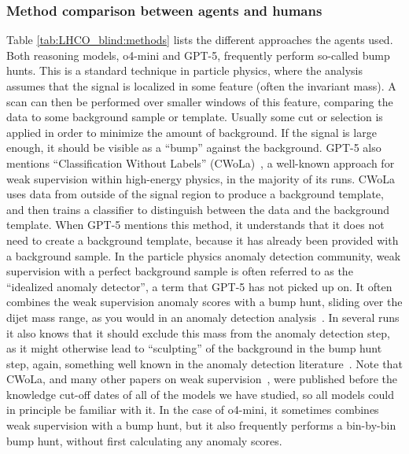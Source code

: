 \documentclass[submission, Phys]{SciPost}
\begin{document}
\subsubsection{Method comparison between agents and humans}
\label{sec:LHCO_blind_methods}
Table \ref{tab:LHCO_blind:methods} lists the different approaches the agents used. Both reasoning models, o4-mini and GPT-5, frequently perform so-called bump hunts. This is a standard technique in particle physics, where the analysis assumes that the signal is localized in some feature (often the invariant mass). A scan can then be performed over smaller windows of this feature, comparing the data to some background sample or template. Usually some cut or selection is applied in order to minimize the amount of background. If the signal is large enough, it should be visible as a ``bump'' against the background. GPT-5 also mentions ``Classification Without Labels'' (CWoLa)~\cite{Metodiev:2017vrx,Collins:2018epr,Collins:2019jip}, a well-known approach for weak supervision within high-energy physics, in the majority of its runs. CWoLa uses data from outside of the signal region to produce a background template, and then trains a classifier to distinguish between the data and the background template. When GPT-5 mentions this method, it understands that it does not need to create a background template, because it has already been provided with a background sample. In the particle physics anomaly detection community, weak supervision with a perfect background sample is often referred to as the ``idealized anomaly detector'', a term that GPT-5 has not picked up on. It often combines the weak supervision anomaly scores with a bump hunt, sliding over the dijet mass range, as you would in an anomaly detection analysis~\cite{CMS:2024nsz,ATLAS:2021weak}. In several runs it also knows that it should exclude this mass from the anomaly detection step, as it might otherwise lead to ``sculpting'' of the background in the bump hunt step, again, something well known in the anomaly detection literature~\cite{Benkendorfer:2020gek, Hallin:2022eoq}. Note that CWoLa, and many other papers on weak supervision~\cite{Nachman:2020lpy, Hallin:2021wme, Raine:2022hht, Golling:2022nkl}, were published before the knowledge cut-off dates of all of the models we have studied, so all models could in principle be familiar with it. In the case of o4-mini, it sometimes combines weak supervision with a bump hunt, but it also frequently performs a bin-by-bin bump hunt, without first calculating any anomaly scores.
\end{document}
